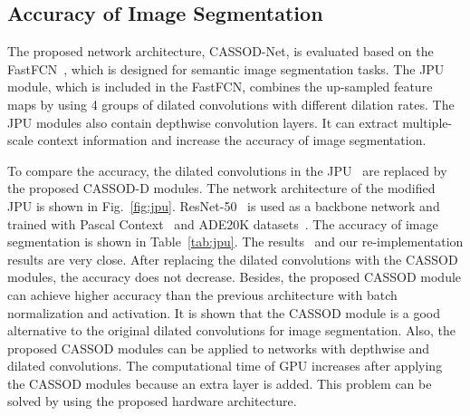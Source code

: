 \documentclass[10pt,twocolumn,letterpaper]{article}
\begin{document}
\subsection{Accuracy of Image Segmentation}
\label{subsec:segmentation}

The proposed network architecture, CASSOD-Net, is evaluated based on the FastFCN~\cite{Wu19}, which is designed for semantic image segmentation tasks. The JPU module, which is included in the FastFCN, combines the up-sampled feature maps by using 4 groups of dilated convolutions with different dilation rates. The JPU modules also contain depthwise convolution layers. It can extract multiple-scale context information and increase the accuracy of image segmentation.

To compare the accuracy, the dilated convolutions in the JPU~\cite{Wu19} are replaced by the proposed CASSOD-D modules. The network architecture of the modified JPU is shown in Fig.~\ref{fig:jpu}. ResNet-50~\cite{He15} is used as a backbone network and trained with Pascal Context~\cite{Mottaghi14} and ADE20K datasets~\cite{Zhou17}. The accuracy of image segmentation is shown in Table~\ref{tab:jpu}. The results~\cite{Wu19} and our re-implementation results are very close. After replacing the dilated convolutions with the CASSOD modules, the accuracy does not decrease. Besides, the proposed CASSOD module can achieve higher accuracy than the previous architecture with batch normalization and activation. It is shown that the CASSOD module is a good alternative to the original dilated convolutions for image segmentation. Also, the proposed CASSOD modules can be applied to networks with depthwise and dilated convolutions. The computational time of GPU increases after applying the CASSOD modules because an extra layer is added. This problem can be solved by using the proposed hardware architecture.
\end{document}
